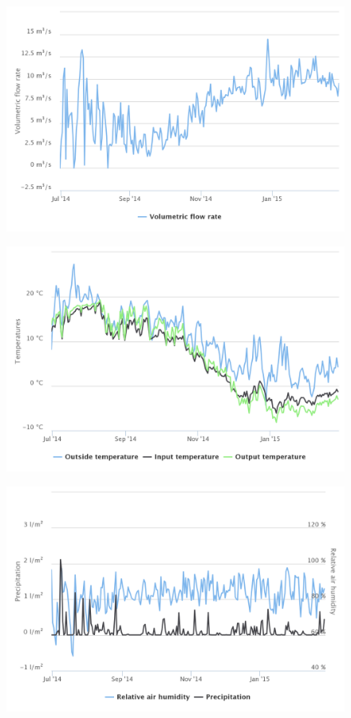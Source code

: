 \documentclass{scrartcl}
\begin{document}
\begin{figure}[H]
  \centering
  \includegraphics[width=0.8\linewidth]{img/Volumetric_flow.png}
  \caption{}
\end{figure}

\begin{figure}[H]
  \centering
  \includegraphics[width=0.8\linewidth]{img/Temperatures.png}
  \caption{}
\end{figure}

\begin{figure}[H]
  \centering
  \includegraphics[width=0.8\linewidth]{img/humidity.png}
  \caption{}
\end{figure}
\end{document}
